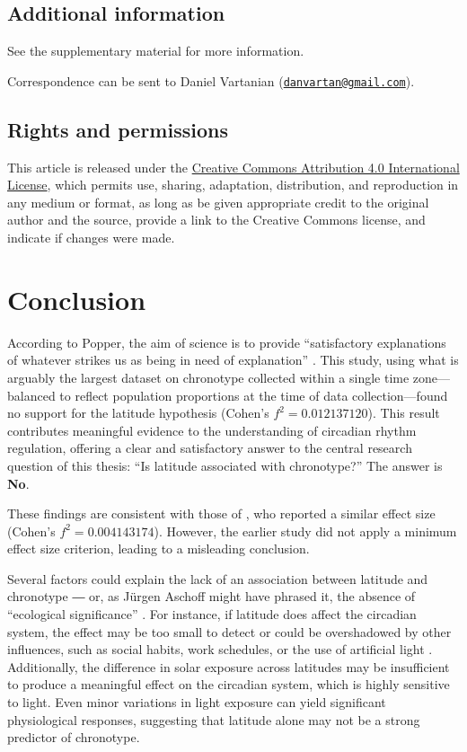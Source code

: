 \documentclass[
12pt,
openright,
oneside,
a4paper,
chapter=TITLE,
section=TITLE,
french,
spanish,
brazil,
english
]{abntex2}
\begin{document}
\section{Additional information}\label{additional-information}

See the supplementary material for more information.

Correspondence can be sent to Daniel Vartanian
(\href{mailto:danvartan@gmail.com}{\nolinkurl{danvartan@gmail.com}}).

\section{Rights and permissions}\label{rights-and-permissions}

This article is released under the
\href{http://creativecommons.org/licenses/by/4.0/}{Creative Commons
Attribution 4.0 International License}, which permits use, sharing,
adaptation, distribution, and reproduction in any medium or format, as
long as be given appropriate credit to the original author and the
source, provide a link to the Creative Commons license, and indicate if
changes were made.


\chapter{Conclusion}\label{conclusion}

According to Popper, the aim of science is to provide ``satisfactory
explanations of whatever strikes us as being in need of explanation''
\autocite[193]{popper1979}. This study, using what is arguably the
largest dataset on chronotype collected within a single time
zone---balanced to reflect population proportions at the time of data
collection---found no support for the latitude hypothesis (Cohen's
\(f^2 = 0.012137120\)). This result contributes meaningful evidence to
the understanding of circadian rhythm regulation, offering a clear and
satisfactory answer to the central research question of this thesis:
``Is latitude associated with chronotype?'' The answer is \textbf{No}.

These findings are consistent with those of
\textcite{leocadio-miguel2017}, who reported a similar effect size
(Cohen's \(f^2 = 0.004143174\)). However, the earlier study did not
apply a minimum effect size criterion, leading to a misleading
conclusion.

Several factors could explain the lack of an association between
latitude and chronotype ― or, as Jürgen Aschoff might have phrased it,
the absence of ``ecological significance'' \autocite{aschoff1972}. For
instance, if latitude does affect the circadian system, the effect may
be too small to detect or could be overshadowed by other influences,
such as social habits, work schedules, or the use of artificial light
\autocite{bohlen1973,skeldon2021}. Additionally, the difference in solar
exposure across latitudes may be insufficient to produce a meaningful
effect on the circadian system, which is highly sensitive to light. Even
minor variations in light exposure can yield significant physiological
responses, suggesting that latitude alone may not be a strong predictor
of chronotype.
\end{document}
